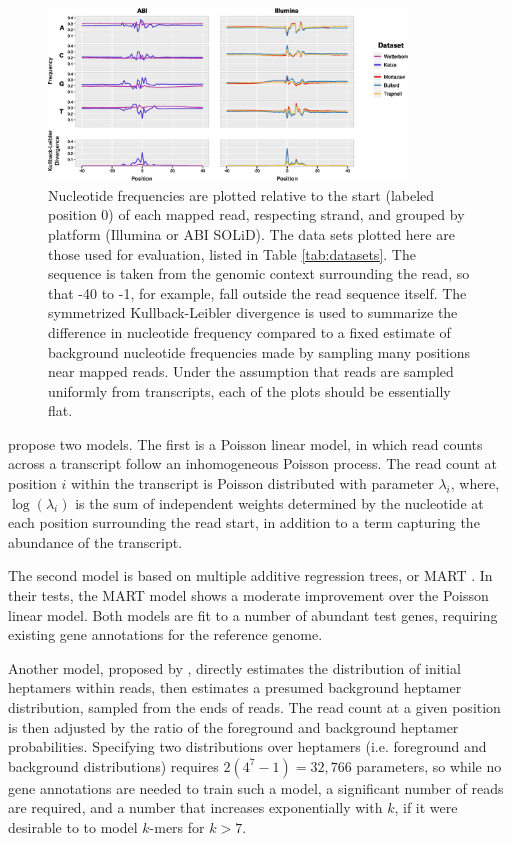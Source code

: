 \documentclass{bioinfo}
\begin{document}
\begin{figure}
\centerline{\includegraphics[width=0.85\textwidth]{freqs.eps}}
\caption{Nucleotide frequencies are plotted relative to the start (labeled
position 0) of each mapped read, respecting strand, and grouped by platform
(Illumina or ABI SOLiD).  The data sets plotted here are those used
for evaluation, listed in Table \ref{tab:datasets}.
The sequence is taken from the genomic context surrounding the read, so that -40
to -1, for example, fall outside the read sequence itself. The symmetrized
Kullback-Leibler divergence is used to summarize the difference in nucleotide
frequency compared to a fixed estimate of background nucleotide frequencies made
by sampling many positions near mapped reads.  Under the assumption that reads
are sampled uniformly from transcripts, each of the plots should be essentially
flat.}
\label{fig:freqs}
\end{figure}

\citet{Li2010} propose two models. The first is a Poisson linear model, in which
read counts across a transcript follow an inhomogeneous Poisson process. The
read count at position $i$ within the transcript is Poisson distributed with
parameter $\lambda_i$, where, $\log(\lambda_i)$ is the sum of independent
weights determined by the nucleotide at each position surrounding the read
start, in addition to a term capturing the abundance of the transcript.

The second model is based on multiple additive regression trees, or MART
\citep{Friedman2003}.  In their tests, the MART model shows a moderate
improvement over the Poisson linear model. Both models are fit to a number of
abundant test genes, requiring existing gene annotations for the reference
genome. 

Another model, proposed by \citet{Hansen2010}, directly estimates the
distribution of initial heptamers within reads, then estimates a presumed
background heptamer distribution, sampled from the ends of reads. The read count
at a given position is then adjusted by the ratio of the foreground and
background heptamer probabilities. Specifying two distributions over heptamers
(i.e. foreground and background distributions) requires \mbox{$2(4^7-1) =
32,766$} parameters, so while no gene annotations are needed to train such a
model, a significant number of reads are required, and a number that increases
exponentially with $k$, if it were desirable to to model $k$-mers for $k > 7$.
\end{document}
